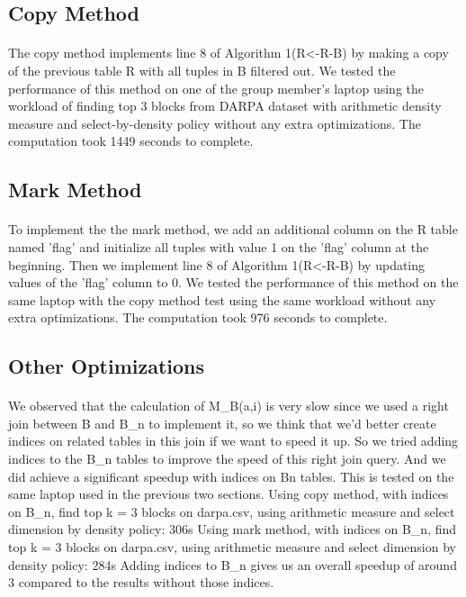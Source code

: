 \subsection{Copy Method}
\paragraph{} The copy method implements line 8 of Algorithm 1(R<-R-B) by making a copy of the previous table R with all tuples in B filtered out. We tested the performance of this method on one of the group member's laptop
using the workload of finding top 3 blocks from DARPA dataset with arithmetic density measure and select-by-density policy without any extra optimizations. The computation took 1449 seconds to complete.
\subsection{Mark Method}
\paragraph{} To implement the the mark method, we add an additional column on the R table named 'flag' and initialize all tuples with value 1 on the 'flag' column at the beginning. Then we implement line 8 of Algorithm 1(R<-R-B) by
updating values of the 'flag' column to 0. We tested the performance of this method on the same laptop with the copy method test using the same workload without any extra optimizations. The computation took 976 seconds to complete.
\subsection{Other Optimizations}
\paragraph{} We observed that the calculation of M_B(a,i) is very slow since we used a right join between B and B_n to implement it, so we think that we’d better create indices on related tables in this join if we want to speed it up.
So we tried adding indices to the B_n tables to improve the speed of this right join query. And we did achieve a significant speedup with indices on Bn tables. This is tested on the same laptop used in the previous two sections.
Using copy method, with indices on B_n, find top k = 3 blocks on darpa.csv, using arithmetic measure and select dimension by density policy: 306s
Using mark method, with indices on B_n, find top k = 3 blocks on darpa.csv, using arithmetic measure and select dimension by density policy: 284s
Adding indices to B_n gives us an overall speedup of around 3 compared to the results without those indices.
